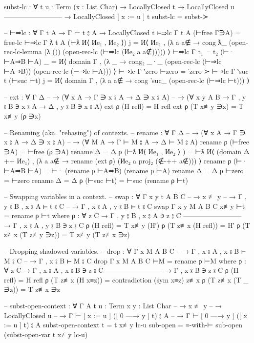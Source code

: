 \documentclass[logo,bsc,singlespacing,parskip,online]{infthesis}
\renewenvironment{code}{\mintedcopy[breaklines,breaksymbolleft=\;]{agda}}{\endmintedcopy}
\begin{document}
\begin{code}
subst-lc : ∀ {t u : Term} (x : List Char)
  → LocallyClosed t
  → LocallyClosed u
    --------------------------
  → LocallyClosed [ x := u ] t
subst-lc = subst-≻

-- ⊢⇒lc : ∀ {Γ t A} → Γ ⊢ t ⦂ A → LocallyClosed t
⊢⇒lc {Γ} {t} {A} (⊢free Γ∋A) = free-lc
⊢⇒lc {Γ} {ƛ t} {A} (⊢ƛ И⟨ Иe₁ ,  Иe₂ ⟩) j =
  И⟨ Иe₁ , (λ a {a∉} → cong ƛ_
    (open-rec-lc-lemma
      (λ ())
      (open-rec-lc (⊢⇒lc (Иe₂ a {a∉}))))) ⟩
⊢⇒lc {Γ} {t₁ · t₂} (⊢· ⊢A⇒B ⊢A) _ =
  И⟨ domain Γ , (λ _ → cong₂ _·_
    (open-rec-lc (⊢⇒lc ⊢A⇒B)) (open-rec-lc (⊢⇒lc ⊢A))) ⟩
⊢⇒lc {Γ} {‵zero} ⊢zero = ‵zero-≻
⊢⇒lc {Γ} {‵suc t} (⊢suc ⊢t) j =
  И⟨ domain Γ , (λ a {a∉} →
    cong ‵suc_ (open-rec-lc (⊢⇒lc ⊢t))) ⟩

-- ext : ∀ {Γ Δ}
--   → (∀ {x A}     →         Γ ∋ x ⦂ A →         Δ ∋ x ⦂ A)
--   → (∀ {x y A B} → Γ , y ⦂ B ∋ x ⦂ A → Δ , y ⦂ B ∋ x ⦂ A)
ext ρ (H refl) = H refl
ext ρ (T x≢y ∋x) = T x≢y (ρ ∋x)

-- Renaming (aka. "rebasing") of contexts.
-- rename : ∀ {Γ Δ}
--   → (∀ {x A} → Γ ∋ x ⦂ A → Δ ∋ x ⦂ A)
--   → (∀ {M A} → Γ ⊢ M ⦂ A → Δ ⊢ M ⦂ A)
rename ρ (⊢free ∋A) = ⊢free (ρ ∋A)
rename {Δ = Δ} ρ (⊢ƛ И⟨ Иe₁ , Иe₂ ⟩ ) =
  ⊢ƛ И⟨ (domain Δ ++ Иe₁) , (λ a {a∉} →
    rename (ext ρ) (Иe₂ a {proj₂ (∉-++ a∉)})) ⟩
rename ρ (⊢· ⊢A⇒B ⊢A) = ⊢· (rename ρ ⊢A⇒B) (rename ρ ⊢A)
rename {Δ = Δ} ρ ⊢zero = ⊢zero
rename {Δ = Δ} ρ (⊢suc ⊢t) = ⊢suc (rename ρ ⊢t)

-- Swapping variables in a context.
-- swap : ∀ {Γ x y t A B C}
--   → x ≢ y
--   → Γ , y ⦂ B , x ⦂ A ⊢ t ⦂ C
--   → Γ , x ⦂ A , y ⦂ B ⊢ t ⦂ C
swap {Γ} {x} {y} {M} {A} {B} {C} x≢y ⊢t = rename ρ ⊢t
  where
    ρ : ∀ {z C}
      → Γ , y ⦂ B , x ⦂ A ∋ z ⦂ C
        --------------------------
      → Γ , x ⦂ A , y ⦂ B ∋ z ⦂ C
    ρ (H refl) = T x≢y (H′)
    ρ (T z≢x (H refl)) = H′
    ρ (T z≢x (T z≢y ∋z)) = T z≢y (T z≢x ∋z)

-- Dropping shadowed variables.
-- drop : ∀ {Γ x M A B C}
--   → Γ , x ⦂ A , x ⦂ B ⊢ M ⦂ C
--   → Γ , x ⦂ B ⊢ M ⦂ C
drop {Γ} {x} {M} {A} {B} {C} ⊢M = rename ρ ⊢M
  where
    ρ : ∀ {z C}
      → Γ , x ⦂ A , x ⦂ B ∋ z ⦂ C
        -------------------------
      → Γ , x ⦂ B ∋ z ⦂ C
    ρ (H refl) = H refl
    ρ (T z≢x (H x≡z)) = contradiction (sym x≡z) z≢x
    ρ (T z≢x (T _ ∋z)) = T z≢x ∋z

-- subst-open-context : ∀ {Γ A} {t u : Term} {x y : List Char}
--   → x ≢ y
--   → LocallyClosed u
--   → Γ ⊢ [ x := u ] ([ 0 —→ y ] t) ⦂ A
--   → Γ ⊢ [ 0 —→ y ] ([ x := u ] t) ⦂ A
subst-open-context {t = t} x≢y lc-u sub-open =
  ≡-with-⊢ sub-open (subst-open-var t x≢y lc-u)
\end{code}
\end{document}
